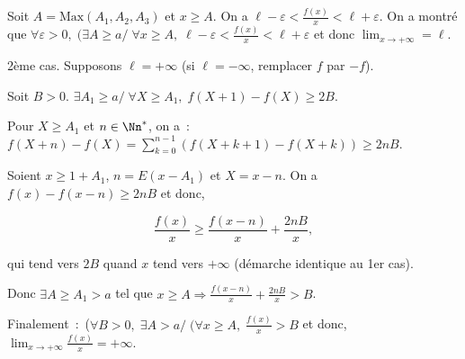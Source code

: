 {{Soit $A=\mbox{Max}(A_1,A_2,A_3)$ et $x\geq A$. On a $\ell-\varepsilon<\frac{f(x)}{x}<\ell+\varepsilon$. On a montré que $\forall\varepsilon>0,\;(\exists A\geq a/\;\forall x\geq A,\;\ell-\varepsilon<\frac{f(x)}{x}<\ell+\varepsilon$ et donc $\lim_{x\rightarrow +\infty}=\ell$.

2ème cas. Supposons $\ell=+\infty$ (si $\ell=-\infty$, remplacer $f$ par $-f$).

Soit $B>0$. $\exists A_1\geq a/\;\forall X\geq A_1,\;f(X+1)-f(X)\geq 2B$.

Pour $X\geq A_1$ et $n\in\Nn^*$, on a~:~$f(X+n)-f(X)=\sum_{k=0}^{n-1}(f(X+k+1)-f(X+k))\geq2nB$.

Soient $x\geq1+A_1$, $n=E(x-A_1)$ et $X=x-n$. On a $f(x)-f(x-n)\geq2nB$ et donc,

$$\frac{f(x)}{x}\geq\frac{f(x-n)}{x}+\frac{2nB}{x},$$

qui tend vers $2B$ quand $x$ tend vers $+\infty$ (démarche identique au 1er cas).

Donc $\exists A\geq A_1>a$ tel que $x\geq A\Rightarrow\frac{f(x-n)}{x}+\frac{2nB}{x}>B$.

Finalement~:~($\forall B>0,\;\exists A>a/\;(\forall x\geq A,\;\frac{f(x)}{x}>B$ et donc, $\lim_{x\rightarrow +\infty}\frac{f(x)}{x}=+\infty$.
}
}
